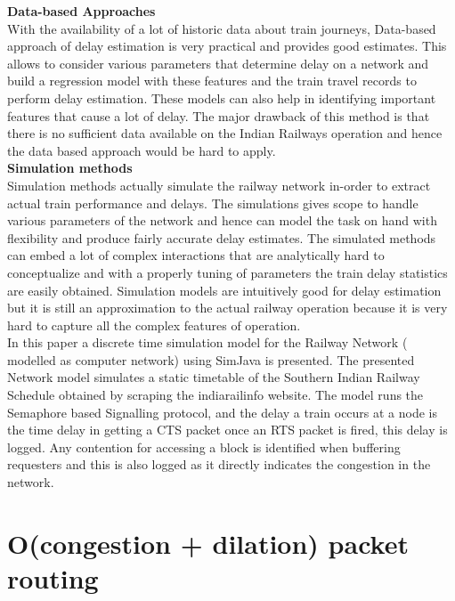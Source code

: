 \documentclass[twoside,11pt]{article}
\begin{document}
{\noindent \bf Data-based Approaches } \\

With the availability of a lot of historic data about train journeys, Data-based
approach of delay estimation is very practical and provides good estimates. This
allows to consider various parameters that determine delay on a network and build
a regression model with these features and the train travel records to perform
delay estimation. These models can also help in identifying important features
that cause a lot of delay. The major drawback of this method is that there is 
no sufficient data available on the Indian Railways operation and hence the data based approach would be hard to apply.
\\

{\noindent \bf Simulation methods} \\

Simulation methods actually simulate the railway network in-order to extract
actual train performance and delays. The simulations gives scope to handle various parameters of the network and hence can model the task on hand with flexibility and 
produce fairly accurate delay estimates. The simulated methods can embed a
lot of complex interactions that are analytically hard to conceptualize and with
a properly tuning of parameters the train delay statistics are easily obtained. Simulation models are intuitively good for delay estimation but it is still an approximation to the actual railway operation because it is very hard to capture all the complex features of operation. \\

In this paper a discrete time simulation model for the Railway Network ( modelled as computer network) using SimJava is presented. The presented Network model simulates a static timetable of the Southern Indian Railway Schedule obtained by scraping the indiarailinfo website. The model runs the Semaphore based Signalling protocol, and the delay a train occurs at a node is the time delay in getting a CTS packet once an RTS packet is fired, this delay is logged. Any contention for accessing a block is identified when buffering requesters and this is also logged as it directly indicates the congestion in the network.  

\section{O(congestion + dilation) packet routing}
\end{document}
